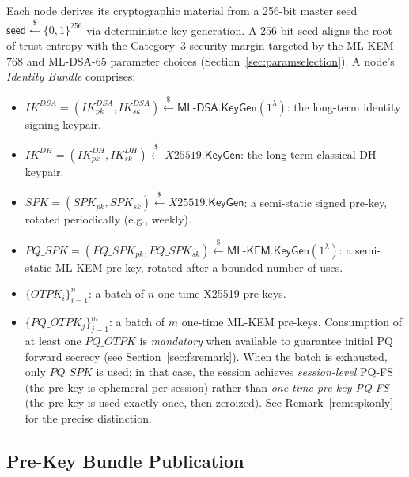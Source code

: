 \documentclass[11pt,a4paper]{article}
\theoremstyle{remark}
\theoremstyle{plain}
\newcommand{\bits}{\{0,1\}}
\newcommand{\getsr}{\stackrel{\$}{\leftarrow}}
\newcommand{\MLKEM}{\mathsf{ML\text{-}KEM}}
\newcommand{\MLDSA}{\mathsf{ML\text{-}DSA}}
\newcommand{\KeyGen}{\mathsf{KeyGen}}
\begin{document}
Each node derives its cryptographic material from a 256-bit master seed
$\mathsf{seed} \getsr \bits^{256}$ via deterministic key generation.  A 256-bit seed aligns
the root-of-trust entropy with the Category~3 security margin targeted by the ML-KEM-768 and
ML-DSA-65 parameter choices (Section~\ref{sec:paramselection}).  A node's \emph{Identity
Bundle} comprises:
\begin{itemize}
  \item $IK^{DSA} = (IK^{DSA}_{pk}, IK^{DSA}_{sk}) \getsr \MLDSA.\KeyGen(1^\lambda)$: the
        long-term identity signing keypair.
  \item $IK^{DH} = (IK^{DH}_{pk}, IK^{DH}_{sk}) \getsr X25519.\KeyGen$: the long-term
        classical DH keypair.
  \item $SPK = (SPK_{pk}, SPK_{sk}) \getsr X25519.\KeyGen$: a semi-static signed pre-key,
        rotated periodically (e.g., weekly).
  \item $PQ\_SPK = (PQ\_SPK_{pk}, PQ\_SPK_{sk}) \getsr \MLKEM.\KeyGen(1^\lambda)$: a
        semi-static ML-KEM pre-key, rotated after a bounded number of uses.
  \item $\{OTPK_i\}_{i=1}^{n}$: a batch of $n$ one-time X25519 pre-keys.
  \item $\{PQ\_OTPK_j\}_{j=1}^{m}$: a batch of $m$ one-time ML-KEM pre-keys.  Consumption of
        at least one $PQ\_OTPK$ is \emph{mandatory} when available to guarantee initial PQ
        forward secrecy (see Section~\ref{sec:fsremark}).  When the batch is exhausted, only
        $PQ\_SPK$ is used; in that case, the session achieves \emph{session-level} PQ-FS (the
        pre-key is ephemeral per session) rather than \emph{one-time pre-key PQ-FS} (the
        pre-key is used exactly once, then zeroized).  See Remark~\ref{rem:spkonly} for the
        precise distinction.
\end{itemize}

\subsection{Pre-Key Bundle Publication}
\label{sec:bundle}
\end{document}
